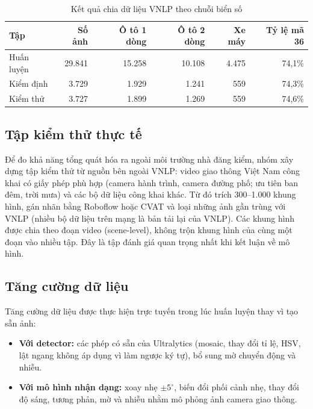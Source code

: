\begin{table}[H]
\centering
\small
\begin{tabular}{|l|r|r|r|r|r|}
\hline
\textbf{Tập} & \textbf{Số ảnh} & \textbf{Ô tô 1 dòng} & \textbf{Ô tô 2 dòng} & \textbf{Xe máy} & \textbf{Tỷ lệ mã 36} \\
\hline
Huấn luyện & 29.841 & 15.258 & 10.108 & 4.475 & 74,1\% \\
Kiểm định & 3.729 & 1.929 & 1.241 & 559 & 74,3\% \\
Kiểm thử & 3.727 & 1.899 & 1.269 & 559 & 74,6\% \\
\hline
\end{tabular}
\caption{Kết quả chia dữ liệu VNLP theo chuỗi biển số}
\label{tab:split_result}
\end{table}

\subsection{Tập kiểm thử thực tế}

Để đo khả năng tổng quát hóa ra ngoài môi trường nhà đăng kiểm, nhóm xây dựng tập kiểm thử từ nguồn bên ngoài VNLP: video giao thông Việt Nam công khai có giấy phép phù hợp (camera hành trình, camera đường phố; ưu tiên ban đêm, trời mưa) và các bộ dữ liệu công khai khác. Từ đó trích 300--1.000 khung hình, gán nhãn bằng Roboflow hoặc CVAT và loại những ảnh gần trùng với VNLP (nhiều bộ dữ liệu trên mạng là bản tải lại của VNLP). Các khung hình được chia theo đoạn video (scene-level), không trộn khung hình của cùng một đoạn vào nhiều tập. Đây là tập đánh giá quan trọng nhất khi kết luận về mô hình.

\subsection{Tăng cường dữ liệu}

Tăng cường dữ liệu được thực hiện trực tuyến trong lúc huấn luyện thay vì tạo sẵn ảnh:
\begin{itemize}
  \item \textbf{Với detector:} các phép có sẵn của Ultralytics (mosaic, thay đổi tỉ lệ, HSV, lật ngang không áp dụng vì làm ngược ký tự), bổ sung mờ chuyển động và nhiễu.
  \item \textbf{Với mô hình nhận dạng:} xoay nhẹ $\pm 5^\circ$, biến đổi phối cảnh nhẹ, thay đổi độ sáng, tương phản, mờ và nhiễu nhằm mô phỏng ảnh camera giao thông.
\end{itemize}

